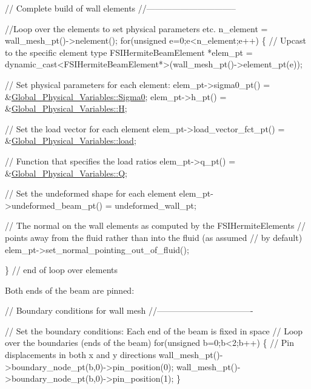 \begin{DoxyCodeInclude}




 \textcolor{comment}{// Complete build of wall elements}
 \textcolor{comment}{//--------------------------------}
  
 \textcolor{comment}{//Loop over the elements to set physical parameters etc.}
 n\_element = wall\_mesh\_pt()->nelement();
 \textcolor{keywordflow}{for}(\textcolor{keywordtype}{unsigned} e=0;e<n\_element;e++)
  \{
   \textcolor{comment}{// Upcast to the specific element type}
   FSIHermiteBeamElement *elem\_pt = 
    \textcolor{keyword}{dynamic\_cast<}FSIHermiteBeamElement*\textcolor{keyword}{>}(wall\_mesh\_pt()->element\_pt(e));
    
   \textcolor{comment}{// Set physical parameters for each element:}
   elem\_pt->sigma0\_pt() = &\hyperlink{namespaceGlobal__Physical__Variables_a417dc688a70c4f06ef0faed047068ba2}{Global\_Physical\_Variables::Sigma0};
   elem\_pt->h\_pt() = &\hyperlink{namespaceGlobal__Physical__Variables_af6e07423e22c0991084d9a2f43727805}{Global\_Physical\_Variables::H};
    
   \textcolor{comment}{// Set the load vector for each element}
   elem\_pt->load\_vector\_fct\_pt() = &\hyperlink{namespaceGlobal__Physical__Variables_a321267e1efb30b5d586302509354fb07}{Global\_Physical\_Variables::load};

   \textcolor{comment}{// Function that specifies the load ratios}
   elem\_pt->q\_pt() = &\hyperlink{namespaceGlobal__Physical__Variables_a66cb7ecda9ba0cd72367dd697f154545}{Global\_Physical\_Variables::Q};

   \textcolor{comment}{// Set the undeformed shape for each element}
   elem\_pt->undeformed\_beam\_pt() = undeformed\_wall\_pt;


   \textcolor{comment}{// The normal on the wall elements as computed by the FSIHermiteElements}
   \textcolor{comment}{// points away from the fluid rather than into the fluid (as assumed}
   \textcolor{comment}{// by default)}
   elem\_pt->set\_normal\_pointing\_out\_of\_fluid();

  \} \textcolor{comment}{// end of loop over elements}

\end{DoxyCodeInclude}


Both ends of the beam are pinned\+:


\begin{DoxyCodeInclude}



 \textcolor{comment}{// Boundary conditions for wall mesh}
 \textcolor{comment}{//----------------------------------}

 \textcolor{comment}{// Set the boundary conditions: Each end of the beam is fixed in space}
 \textcolor{comment}{// Loop over the boundaries (ends of the beam)}
 \textcolor{keywordflow}{for}(\textcolor{keywordtype}{unsigned} b=0;b<2;b++)
  \{
   \textcolor{comment}{// Pin displacements in both x and y directions}
   wall\_mesh\_pt()->boundary\_node\_pt(b,0)->pin\_position(0); 
   wall\_mesh\_pt()->boundary\_node\_pt(b,0)->pin\_position(1);
  \}

\end{DoxyCodeInclude}


